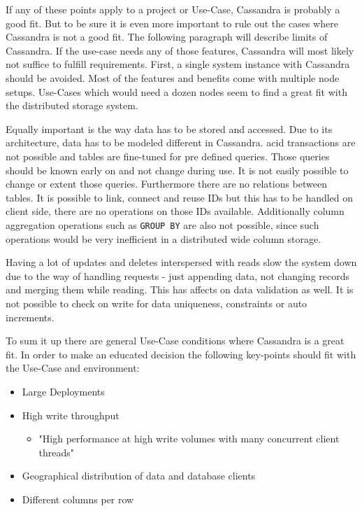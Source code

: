 If any of these points apply to a project or Use-Case, Cassandra is probably a good fit.
But to be sure it is even more important to rule out the cases where Cassandra is not a good fit.
The following paragraph will describe limits of Cassandra. If the use-case needs any of those features, Cassandra will most likely not suffice to fulfill requirements.
First, a single system instance with Cassandra should be avoided. Most of the features and benefits come with multiple node setups. Use-Cases which would need a dozen nodes seem to find a great fit with the distributed storage system.

Equally important is the way data has to be stored and accessed. Due to its architecture, data has to be modeled different in Cassandra. \acrshort{acid} transactions are not possible and tables are fine-tuned for pre defined queries. Those queries should be known early on and not change during use. It is not easily possible to change or extent those queries. Furthermore there are no relations between tables. It is possible to link, connect and reuse IDs but this has to be handled on client side, there are no operations on those IDs available. Additionally column aggregation operations such as \texttt{GROUP BY} are also not possible, since such operations would be very inefficient in a distributed wide column storage.

Having a lot of updates and deletes interspersed with reads slow the system down due to the way of handling requests - just appending data, not changing records and merging them while reading. This has affects on data validation as well. It is not possible to check on write for data uniqueness, constraints or auto increments. \autocite{cassandra_oreilly}

To sum it up there are general Use-Case conditions where Cassandra is a great fit.
In order to make an educated decision the following key-points should fit with the Use-Case and environment:

\begin{itemize}
    \item Large Deployments
    \item High write throughput
    \begin{itemize}
      \item{"High performance at high write volumes with many concurrent client threads"} \autocite{cassandra_oreilly}
    \end{itemize}
    \item Geographical distribution of data and database clients
    \item Different columns per row
\end{itemize}


